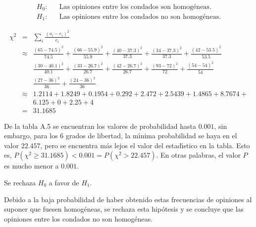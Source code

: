 \begin{solucion}
 \begin{hipotesis}
  \begin{eqnarray*}
   H_0: & & \text{Las opiniones entre los condados son homog\'eneas.} \\
   H_1: & & \text{Las opiniones entre los condados no son homog\'eneas.}
  \end{eqnarray*}
 \end{hipotesis}

 \begin{estadistico}
  \begin{eqnarray*}
   \chi^2 & = & \sum_{i} \frac{\left( o_i - e_i \right)^2}{e_i} \\
   & \approx & \frac{(65 - 74.5)^2}{74.5} + \frac{(66 - 55.9)^2}{55.9} +
   \frac{(40 - 37.3)^2}{37.3} + \frac{(34 - 37.3)^2}{37.3} + 
   \frac{(42 - 53.5)^2}{53.5} \\
   & & \frac{(30 - 40.1)^2}{40.1} + \frac{(33 - 26.7)^2}{26.7} + 
   \frac{(42 - 26.7)^2}{26.7} + \frac{(93 - 72)^2}{72} + 
   \frac{(54 - 54)^2}{54} \\
   & & \frac{(27 - 36)^2}{36} + \frac{(24 - 36)^2}{36} \\
   & \approx & 1.2114 + 1.8249 + 0.1954 + 0.292 + 2.472 + 2.5439 +
   1.4865 + 8.7674 + \\
   & & 6.125 + 0 + 2.25 + 4 \\
   & = & 31.1685
  \end{eqnarray*}
 \end{estadistico}

 \begin{valorp}
  De la tabla A.5 se encuentran los valores de probabilidad hasta $0.001$,
  sin embargo, para los 6 grados de libertad, la m\'{\i}nima probabilidad
  se haya en el valor $22.457$, pero se encuentra m\'as lejos el valor
  del estad\'{\i}stico en la tabla.
  Esto es,
  $P\left(\chi^2\geq 31.1685\right) <0.001 =P\left( \chi^2 > 22.457 \right)$.
  En otras palabras, el valor $P$ es mucho menor a $0.001$.
 \end{valorp}

 \begin{decision}
  Se rechaza $H_0$ a favor de $H_1$.
 \end{decision}

 \begin{conclusion}
  Debido a la baja probabilidad de haber obtenido estas frecuencias
  de opiniones al suponer que fuesen homog\'eneas,
  se rechaza esta hip\'otesis y se concluye
  que las opiniones entre los condados no son homog\'eneas.
 \end{conclusion}


\end{solucion}

